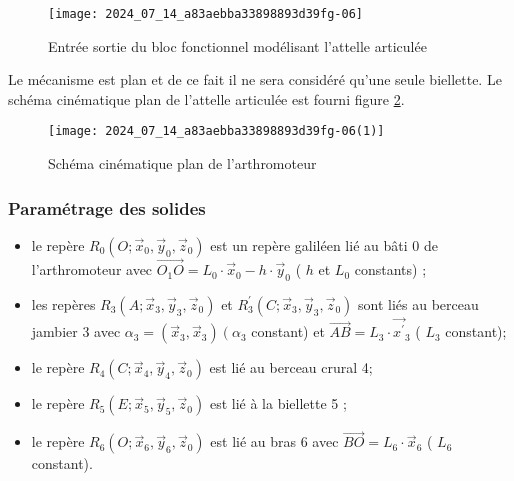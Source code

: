 \begin{figure}[!h]\centering
\texttt{[image: 2024\_07\_14\_a83aebba33898893d39fg-06]}

\caption{\label{fig:ccs_mp_2024:fig:09}Entrée sortie du bloc fonctionnel modélisant l'attelle articulée}
\end{figure}
Le mécanisme est plan et de ce fait il ne sera considéré qu'une seule biellette. Le schéma cinématique plan de l'attelle articulée est fourni figure \ref{fig:ccs_mp_2024:fig:10}.

\begin{figure}[!h]\centering
\texttt{[image: 2024\_07\_14\_a83aebba33898893d39fg-06(1)]}

\caption{\label{fig:ccs_mp_2024:fig:10}Schéma cinématique plan de l'arthromoteur}
\end{figure}

\subsubsection*{Paramétrage des solides }
\begin{itemize}
  \item le repère $R_{0}\left(O ; \vec{x}_{0}, \vec{y}_{0}, \vec{z}_{0}\right)$ est un repère galiléen lié au bâti 0 de l'arthromoteur avec $\overrightarrow{O_{1} O}=L_{0} \cdot \vec{x}_{0}-h \cdot \vec{y}_{0}$ ( $h$ et $L_{0}$ constants) ;
  \item les repères $R_{3}\left(A ; \vec{x}_{3}, \vec{y}_{3}, \vec{z}_{0}\right)$ et $R_{3}^{\prime}\left(C ; \vec{x}_{3}, \vec{y}_{3}, \vec{z}_{0}\right)$ sont liés au berceau jambier 3 avec $\alpha_{3}=\left(\vec{x}_{3}, \vec{x}_{3}\right)\left(\alpha_{3}\right.$ constant) et $\overrightarrow{A B}=L_{3} \cdot \overrightarrow{x^{\prime}}{ }_{3}$ ( $L_{3}$ constant);
  \item le repère $R_{4}\left(C ; \vec{x}_{4}, \vec{y}_{4}, \vec{z}_{0}\right)$ est lié au berceau crural 4;
  \item le repère $R_{5}\left(E ; \vec{x}_{5}, \vec{y}_{5}, \vec{z}_{0}\right)$ est lié à la biellette 5 ;
  \item le repère $R_{6}\left(O ; \vec{x}_{6}, \vec{y}_{6}, \vec{z}_{0}\right)$ est lié au bras 6 avec $\overrightarrow{B O}=L_{6} \cdot \vec{x}_{6}$ ( $L_{6}$ constant).
\end{itemize}
